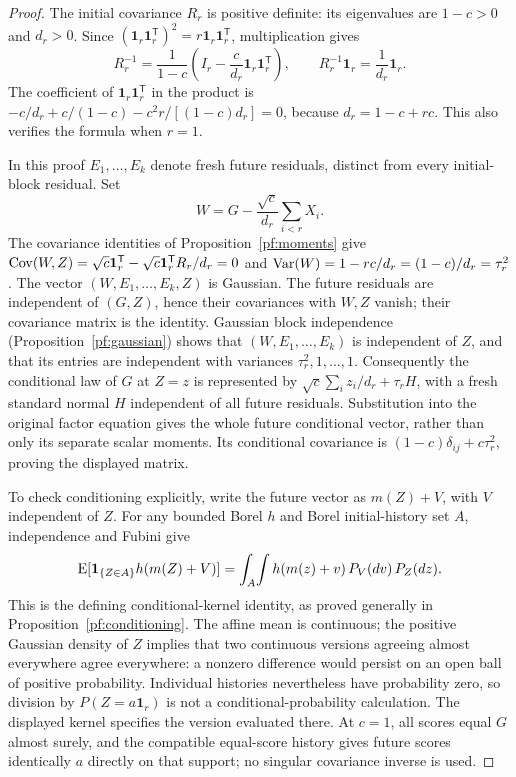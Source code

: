 \begin{proof}
The initial covariance \(R_r\) is positive definite: its eigenvalues
are \(1-c>0\) and \(d_r>0\). Since
\((\mathbf1_r\mathbf1_r^{\mathsf T})^2
=r\mathbf1_r\mathbf1_r^{\mathsf T}\), multiplication gives
\[
 R_r^{-1}=\frac1{1-c}
   \left(I_r-\frac c{d_r}\mathbf1_r\mathbf1_r^{\mathsf T}\right),
 \qquad R_r^{-1}\mathbf1_r=\frac1{d_r}\mathbf1_r.
\]
The coefficient of \(\mathbf1_r\mathbf1_r^{\mathsf T}\) in the product
is \(-c/d_r+c/(1-c)-c^2r/[(1-c)d_r]=0\), because
\(d_r=1-c+rc\). This also verifies the formula when \(r=1\).

In this proof \(E_1,\ldots,E_k\) denote fresh future residuals,
distinct from every initial-block residual. Set
\[
 W=G-\frac{\sqrt c}{d_r}\sum_{i<r}X_i.
\]
The covariance identities of Proposition~\ref{pf:moments} give
\(\operatorname{Cov}(W,Z)=\sqrt c\mathbf1_r^{\mathsf T}
-\sqrt c\mathbf1_r^{\mathsf T}R_r/d_r=0\) and
\(\operatorname{Var}(W)=1-rc/d_r=(1-c)/d_r=\tau_r^2\).
The vector \((W,E_1,\ldots,E_k,Z)\) is Gaussian. The future residuals
are independent of \((G,Z)\), hence their covariances with \(W,Z\)
vanish; their covariance matrix is the identity. Gaussian block
independence (Proposition~\ref{pf:gaussian}) shows that
\((W,E_1,\ldots,E_k)\) is independent of \(Z\), and that its entries
are independent with variances \(\tau_r^2,1,\ldots,1\).
Consequently the conditional law of \(G\) at \(Z=z\) is represented by
\(\sqrt c\sum_i z_i/d_r+\tau_r H\), with a fresh standard normal
\(H\) independent of all future residuals. Substitution into the original
factor equation gives the whole future conditional vector, rather than
only its separate scalar moments. Its conditional covariance is
\((1-c)\delta_{ij}+c\tau_r^2\), proving the displayed matrix.

To check conditioning explicitly, write the future vector as
\(m(Z)+V\), with \(V\) independent of \(Z\). For any bounded Borel
\(h\) and Borel initial-history set \(A\), independence and Fubini give
\[
 \operatorname{E}[\mathbf1_{\{Z\in A\}}h(m(Z)+V)]
 =\int_A\!\int h(m(z)+v)\,P_V(dv)\,P_Z(dz).
\]
This is the defining conditional-kernel identity, as proved generally
in Proposition~\ref{pf:conditioning}. The affine mean is continuous;
the positive Gaussian density of \(Z\) implies that two continuous
versions agreeing almost everywhere agree everywhere: a nonzero
difference would persist on an open ball of positive probability.
Individual histories nevertheless have probability zero, so division by
\(P(Z=a\mathbf1_r)\) is not a conditional-probability calculation.
The displayed kernel specifies the version evaluated there. At \(c=1\),
all scores equal \(G\) almost surely, and the compatible equal-score
history gives future scores identically \(a\) directly on that support;
no singular covariance inverse is used.
\end{proof}

